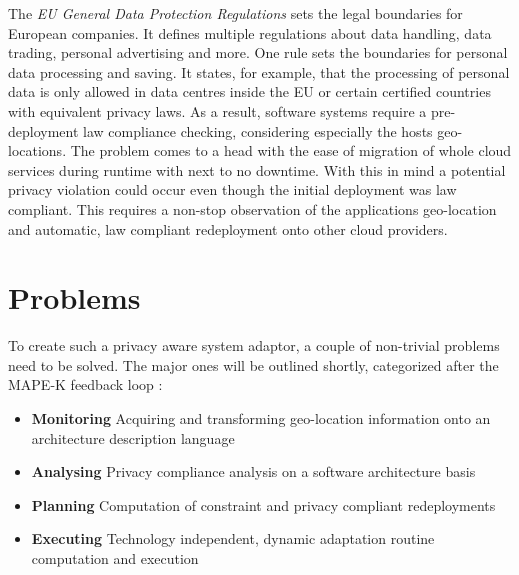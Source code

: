The \textit{EU General Data Protection Regulations} sets the legal boundaries for European companies. It defines multiple regulations about data handling, data trading, personal advertising and more. One rule sets the boundaries for personal data processing and saving. It states, for example, that the processing of personal data is only allowed in data centres inside the EU or certain certified countries with equivalent privacy laws. As a result, software systems require a pre-deployment law compliance checking, considering especially the hosts geo-locations. The problem comes to a head with the ease of migration of whole cloud services during runtime with next to no downtime. With this in mind a potential privacy violation could occur even though the initial deployment was law compliant. This requires a non-stop observation of the applications geo-location and automatic, law compliant redeployment onto other cloud providers.


\section{Problems}
\label{sec:Introduction:problems}

To create such a privacy aware system adaptor, a couple of non-trivial problems need to be solved. The major ones will be outlined shortly, categorized after the MAPE-K feedback loop \cite{Dar.2012}:

\begin{itemize}
	\setlength\itemsep{0em}
	\item \textbf{Monitoring}\newline
	Acquiring and transforming geo-location information onto an architecture description language
	\item \textbf{Analysing}\newline
	Privacy compliance analysis on a software architecture basis
	\item \textbf{Planning}\newline
	Computation of constraint and privacy compliant redeployments
	\item \textbf{Executing}\newline
	Technology independent, dynamic adaptation routine computation and execution
\end{itemize}


